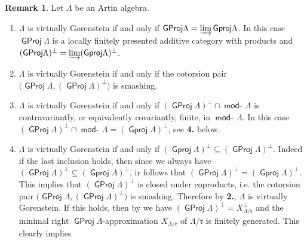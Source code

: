 \documentclass[oneside, a4paper,reqno]{amsart}
\numberwithin{equation}{section}
\theoremstyle{definition}
\newtheorem{rem}[thm]{Remark}
\begin{document}
\begin{rem} Let $\Lambda$ be an Artin algebra.
\begin{enumerate}
\item[{\bf 1}.] $\Lambda$ is virtually Gorenstein if and only if
${\operatorname{\mathsf{GProj}}\nolimits}\Lambda = \operatorname*{\varinjlim}{\operatorname{\mathsf{Gproj}}\nolimits}\Lambda$. In this case ${\operatorname{\mathsf{GProj}}\nolimits}\Lambda$
is a locally finitely presented additive category with products and
$({\operatorname{\mathsf{GProj}}\nolimits}\Lambda)^{\bot} = \operatorname*{\varinjlim}({\operatorname{\mathsf{Gproj}}\nolimits}\Lambda)^{\bot}$.
\item[{\bf 2.}] $\Lambda$ is virtually Gorenstein if and only if the cotorsion pair $\big({\operatorname{\mathsf{GProj}}\nolimits}\Lambda,
({\operatorname{\mathsf{GProj}}\nolimits}\Lambda)^{\bot}\big)$ is smashing.
\item[{\bf 3.}]  $\Lambda$ is virtually Gorenstein if and only if  $({\operatorname{\mathsf{GProj}}\nolimits}\Lambda)^{\bot}\cap \operatorname*{\mathsf{mod}-\!}\Lambda$ is
contravariantly, or equivalently covariantly, finite, in
$\operatorname*{\mathsf{mod}-\!}\Lambda$. In this case $({\operatorname{\mathsf{GProj}}\nolimits}\Lambda)^{\bot}\cap
\operatorname*{\mathsf{mod}-\!}\Lambda = ({\operatorname{\mathsf{Gproj}}\nolimits}\Lambda)^{\bot}$, see {\bf 4.} below.
\item[{\bf 4.}] $\Lambda$ is virtually Gorenstein if and only if
$({\operatorname{\mathsf{Gproj}}\nolimits}\Lambda)^{\pmb{\bot}} \subseteq ({\operatorname{\mathsf{GProj}}\nolimits}\Lambda)^{\bot}$.
Indeed if the last inclusion holds, then since we always have
$({\operatorname{\mathsf{GProj}}\nolimits}\Lambda)^{\bot} \subseteq ({\operatorname{\mathsf{Gproj}}\nolimits}\Lambda)^{\pmb{\bot}}$, ir
follows that $({\operatorname{\mathsf{GProj}}\nolimits}\Lambda)^{\bot} =
({\operatorname{\mathsf{Gproj}}\nolimits}\Lambda)^{\pmb{\bot}}$. This implies that
$({\operatorname{\mathsf{GProj}}\nolimits}\Lambda)^{\bot}$ is closed under coproducts, i.e.  the
cotorsion pair $\big({\operatorname{\mathsf{GProj}}\nolimits}\Lambda, ({\operatorname{\mathsf{GProj}}\nolimits}\Lambda)^{\bot}\big)$ is
smashing. Therefore by {\bf 2.}, $\Lambda$ is virtually Gorenstein.
If this holds, then by \cite{B:cm} we have $({\operatorname{\mathsf{GProj}}\nolimits}\Lambda)^{\bot} =
X^{\pmb{\bot}}_{\Lambda/\mathfrak{r}}$ and the minimal right
${\operatorname{\mathsf{GProj}}\nolimits}\Lambda$-approximation $X_{\Lambda/\mathfrak{r}}$ of
$\Lambda/\mathfrak{r}$ is finitely generated. This clearly implies

\end{enumerate}
\end{rem}
\end{document}
